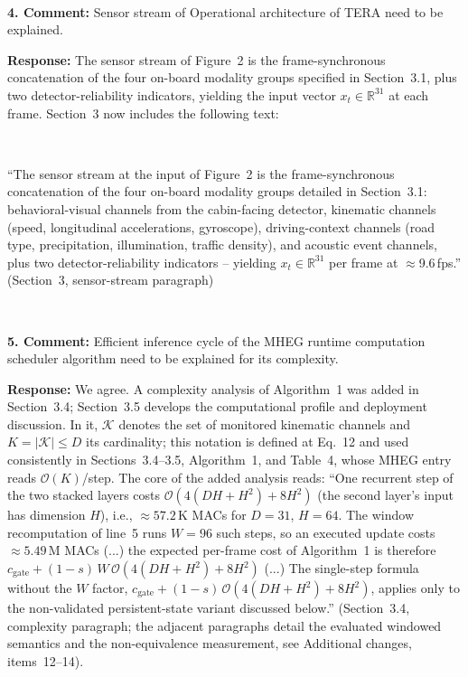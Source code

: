 \documentclass[1p,12pt,authoryear]{elsarticle}
\begin{document}
~

\noindent \textbf{4. Comment:} Sensor stream of Operational architecture of TERA need to be explained.

\vspace{2mm}
\noindent \textbf{Response:} The sensor stream of Figure~2 is the frame-synchronous concatenation of the four on-board modality groups specified in Section~3.1, plus two detector-reliability indicators, yielding the input vector $x_t \in \mathbb{R}^{31}$ at each frame. Section~3 now includes the following text:

~

``The sensor stream at the input of Figure~2 is the frame-synchronous concatenation of the four on-board modality groups detailed in Section~3.1: behavioral-visual channels from the cabin-facing detector, kinematic channels (speed, longitudinal accelerations, gyroscope), driving-context channels (road type, precipitation, illumination, traffic density), and acoustic event channels, plus two detector-reliability indicators -- yielding $x_t \in \mathbb{R}^{31}$ per frame at $\approx$9.6\,fps.'' (Section~3, sensor-stream paragraph)

~

\noindent \textbf{5. Comment:} Efficient inference cycle of the MHEG runtime computation scheduler algorithm need to be explained for its complexity.

\vspace{2mm}
\noindent \textbf{Response:} We agree. A complexity analysis of Algorithm~1 was added in Section~3.4; Section~3.5 develops the computational profile and deployment discussion. In it, $\mathcal{K}$ denotes the set of monitored kinematic channels and $K = |\mathcal{K}| \le D$ its cardinality; this notation is defined at Eq.~12 and used consistently in Sections~3.4--3.5, Algorithm~1, and Table~4, whose MHEG entry reads $\mathcal{O}(K)$/step. The core of the added analysis reads: ``One recurrent step of the two stacked layers costs $\mathcal{O}(4(DH{+}H^2)+8H^2)$ (the second layer's input has dimension $H$), i.e., ${\approx}57.2$\,K MACs for $D{=}31$, $H{=}64$. The window recomputation of line~5 runs $W{=}96$ such steps, so an executed update costs ${\approx}5.49$\,M MACs (...) the expected per-frame cost of Algorithm~1 is therefore $c_{\mathrm{gate}} + (1-s)\,W\,\mathcal{O}(4(DH{+}H^2)+8H^2)$ (...) The single-step formula without the $W$ factor, $c_{\mathrm{gate}} + (1-s)\,\mathcal{O}(4(DH{+}H^2)+8H^2)$, applies only to the non-validated persistent-state variant discussed below.'' (Section~3.4, complexity paragraph; the adjacent paragraphs detail the evaluated windowed semantics and the non-equivalence measurement, see Additional changes, items~12--14).
\end{document}
